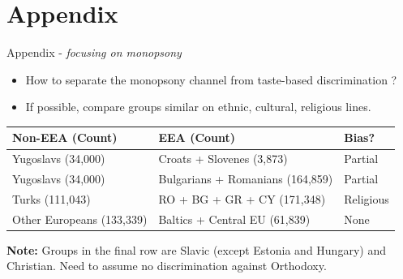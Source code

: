 \documentclass[aspectratio=169,10pt,xcolor={dvipsnames}]{beamer}
\begin{document}
\section*{Appendix}
\begin{frame}{Appendix - \textit{focusing on monopsony}}
\label{ethnic}

\begin{itemize}
    \item How to separate the monopsony channel from taste-based discrimination ?
    \item If possible, compare groups similar on ethnic, cultural, religious lines.
\end{itemize}
\vspace{0.4cm}

{\centering
\renewcommand{\arraystretch}{1.2}
\begin{tabular}{lll}
\toprule
\textbf{Non-EEA (Count)} & \textbf{EEA (Count)} & \textbf{Bias?} \\
\midrule
Yugoslavs (34,000) & Croats + Slovenes (3,873) & Partial \\
Yugoslavs (34,000) & Bulgarians + Romanians (164,859) & Partial \\
Turks (111,043) & RO + BG + GR + CY (171,348) & Religious \\
Other Europeans (133,339) & Baltics + Central EU (61,839) & None \\
\bottomrule
\end{tabular}
}

\vspace{0.3cm}
{\small 
\textbf{Note:} Groups in the final row are Slavic (except Estonia and Hungary) and Christian. Need to assume no discrimination against Orthodoxy.
}  

\hyperlink{DiD}{}
\end{frame}
\end{document}
